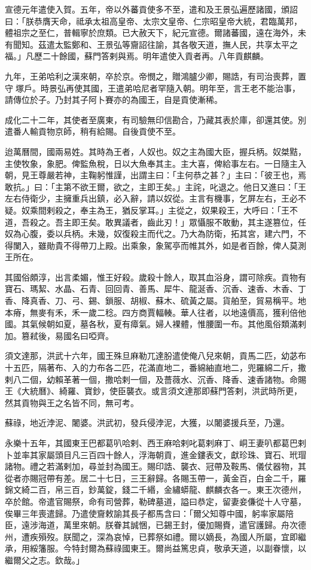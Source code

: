 \begin{pinyinscope}
宣德元年遣使入賀。五年，帝以外蕃貢使多不至，遣和及王景弘遍歷諸國，頒詔曰：「朕恭膺天命，祗承太祖高皇帝、太宗文皇帝、仁宗昭皇帝大統，君臨萬邦，體祖宗之至仁，普輯寧於庶類。已大赦天下，紀元宣德。爾諸蕃國，遠在海外，未有聞知。茲遣太監鄭和、王景弘等齎詔往諭，其各敬天道，撫人民，共享太平之福。」凡歷二十餘國，蘇門答剌與焉。明年遣使入貢者再。八年貢麒麟。

九年，王弟哈利之漢來朝，卒於京。帝憫之，贈鴻臚少卿，賜誥，有司治喪葬，置守塚戶。時景弘再使其國，王遣弟哈尼者罕隨入朝。明年至，言王老不能治事，請傳位於子。乃封其子阿卜賽亦的為國王，自是貢使漸稀。

成化二十二年，其使者至廣東，有司驗無印信勘合，乃藏其表於庫，卻還其使。別遣番人輸貢物京師，稍有給賜。自後貢使不至。

迨萬曆間，國兩易姓。其時為王者，人奴也。奴之主為國大臣，握兵柄。奴桀黠，主使牧象，象肥。俾監魚稅，日以大魚奉其主。主大喜，俾給事左右。一日隨主入朝，見王尊嚴若神，主鞠躬惟謹，出謂主曰：「主何恭之甚？」主曰：「彼王也，焉敢抗。」曰：「主第不欲王爾，欲之，主即王矣。」主詫，叱退之。他日又進曰：「王左右侍衛少，主擁重兵出鎮，必入辭，請以奴從。主言有機事，乞屏左右，王必不疑。奴乘間剌殺之，奉主為王，猶反掌耳。」主從之，奴果殺王，大呼曰：「王不道，吾殺之。吾主即王矣。敢異議者，齒此刃！」眾懾服不敢動，其主遂篡位，任奴為心腹，委以兵柄。未幾，奴復殺主而代之。乃大為防衛，拓其宮，建六門，不得闌入，雖勛貴不得帶刀上殿。出乘象，象駕亭而帷其外，如是者百餘，俾人莫測王所在。

其國俗頗淳，出言柔媚，惟王好殺。歲殺十餘人，取其血浴身，謂可除疾。貢物有寶石、瑪絜、水晶、石青、回回青、善馬、犀牛、龍涎香、沉香、速香、木香、丁香、降真香、刀、弓、錫、鎖服、胡椒、蘇木、硫黃之屬。貨舶至，貿易稱平。地本瘠，無麥有禾，禾一歲二稔。四方商賈輻輳。華人往者，以地遠價高，獲利倍他國。其氣候朝如夏，墓各秋，夏有瘴氣。婦人裸體，惟腰圍一布。其他風俗類滿剌加。篡弒後，易國名曰啞齊。

須文達那，洪武十六年，國王殊旦麻勒兀達朌遣使俺八兒來朝，貢馬二匹，幼苾布十五匹，隔著布、入的力布各二匹，花滿直地二，番綿紬直地二，兜羅綿二斤，撒剌八二個，幼賴革著一個，撒哈剌一個，及薔薇水、沉香、降香、速香諸物。命賜王《大統曆》、綺羅、寶鈔，使臣襲衣。或言須文達那即蘇門答剌，洪武時所更，然其貢物與王之名皆不同，無可考。

蘇祿，地近浡泥、闍婆。洪武初，發兵侵浡泥，大獲，以闍婆援兵至，乃還。

永樂十五年，其國東王巴都葛叭哈剌、西王麻哈剌叱葛剌麻丁、峒王妻叭都葛巴剌卜並率其家屬頭目凡三百四十餘人，浮海朝貢，進金鏤表文，獻珍珠、寶石、玳瑁諸物。禮之若滿剌加，尋並封為國王。賜印誥、襲衣、冠帶及鞍馬、儀仗器物，其從者亦賜冠帶有差。居二十七日，三王辭歸。各賜玉帶一，黃金百，白金二千，羅錦文綺二百，帛三百，鈔萬錠，錢二千緡，金繡蟒龍、麒麟衣各一。東王次德州，卒於館。帝遣官賜祭，命有司營葬，勒碑墓道，謚曰恭定，留妻妾傔從十人守墓，俟畢三年喪遣歸。乃遣使齎敕諭其長子都馬含曰：「爾父知尊中國，躬率家屬陪臣，遠涉海道，萬里來朝。朕眷其誠悃，已錫王封，優加賜賚，遣官護歸。舟次德州，遭疾殞歿。朕聞之，深為哀悼，已葬祭如禮。爾以嫡長，為國人所屬，宜即繼承，用綏籓服。今特封爾為蘇祿國東王。爾尚益篤忠貞，敬承天道，以副眷懷，以繼爾父之志。欽哉。」


\end{pinyinscope}
